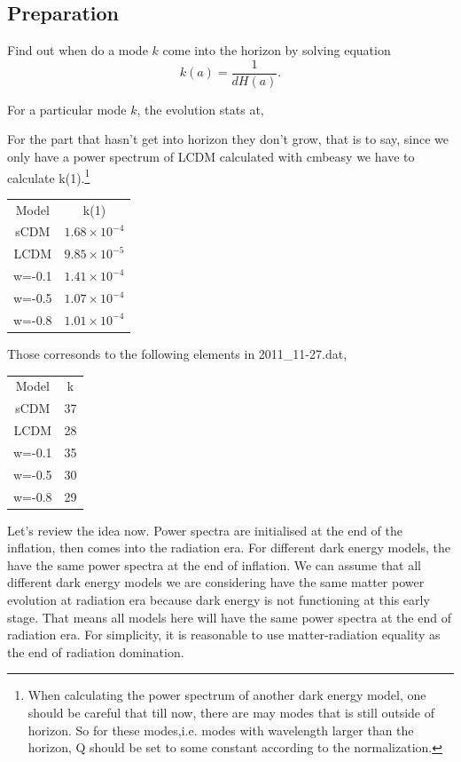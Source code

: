 \documentclass{article}
\begin{document}
\subsection{Preparation}

Find out when do a mode $k$ come into the horizon by solving equation
\begin{equation}
k(a)=\frac{1}{dH(a)}     .
\end{equation}

For a particular mode $k$, the evolution stats at,




For the part that hasn't get into horizon they don't grow, that is to say, since we only have a power spectrum of LCDM calculated with cmbeasy we have to calculate k(1).\footnote{When calculating the power spectrum of another dark energy model, one should be careful that till now, there are may modes that is still outside of horizon. So for these modes,i.e. modes with wavelength larger than the horizon, Q should be set to some constant according to the normalization.}

\begin{center}
\begin{tabular}{cc}
	Model & k(1) \\
	sCDM & $1.68\times 10^{-4}$  \\
	LCDM & $9.85\times 10^{-5}$\\
	w=-0.1 & $1.41\times 10^{-4}$  \\
	w=-0.5 & $1.07\times 10^{-4}$ \\
	w=-0.8 & $1.01\times 10^{-4}$\\
\end{tabular}
\end{center}


Those corresonds to the following elements in 2011\_11-27.dat,


\begin{center}
\begin{tabular}{cc}
	Model & k \\
	sCDM &  37   \\
	LCDM & 28\\
	w=-0.1 & 35  \\
	w=-0.5 & 30 \\
	w=-0.8 & 29\\
\end{tabular}
\end{center}


Let's review the idea now. Power spectra are initialised at the end of the inflation, then comes into the radiation era. For different dark energy models, the have the same power spectra at the end of inflation. We can assume that all different dark energy models we are considering have the same matter power evolution at radiation era because dark energy is not functioning at this early stage. That means all models here will have the same power spectra at the end of radiation era. For simplicity, it is reasonable to use matter-radiation equality as the end of radiation domination.
\end{document}
